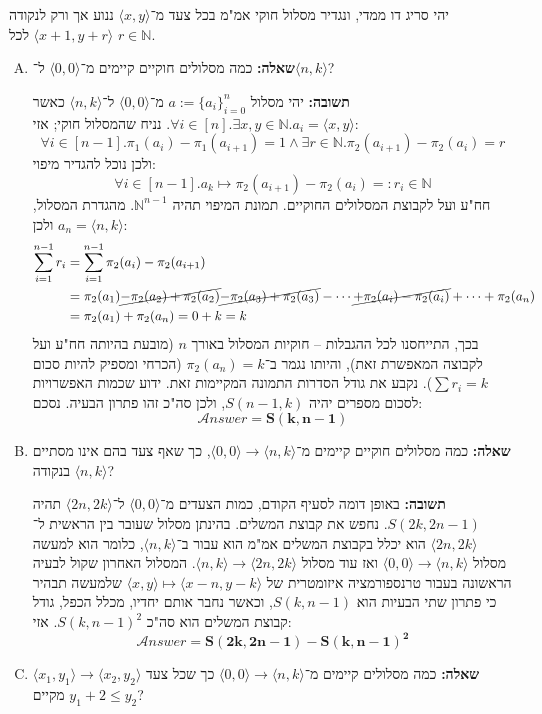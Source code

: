\documentclass[]{article}
\newcommand\N     {\mathbb{N}}
\newcommand\ans   {\mathscr{A}\!\mathit{nswer}}
\newcommand\ra    {\rangle}
\newcommand\la    {\langle}
\begin{document}
	\section{}
	יהי סריג דו ממדי, ונגדיר מסלול חוקי אמ"מ בכל צעד מ־$\la x, y \ra$ ננוע אך ורק לנקודה $\la x + 1, y + r \ra$ לכל $r \in \N$. 
	\begin{enumerate}[(A)]
		\item \textbf{שאלה: }כמה מסלולים חוקיים קיימים מ־$\la 0, 0 \ra$ ל־$\la n, k\ra$? 
		
		\textbf{תשובה: }יהי מסלול $a := \{a_i\}_{i = 0}^n$ מ־$\la 0, 0 \ra$ ל־$\la n, k \ra$ כאשר $\forall i \in [n]. \exists x, y \in \N. a_i = \la x, y \ra$. נניח שהמסלול חוקי; אזי: 
		\[\forall i \in [n - 1]. \pi_1(a_i) - \pi_1(a_{i + 1}) = 1 \land \exists r \in \N. \pi_2(a_{i + 1}) - \pi_2(a_{i}) = r\]
		ולכן נוכל להגדיר מיפוי: 
		\[ \forall i \in [n - 1]. a_k \mapsto \pi_2(a_{i + 1}) - \pi_2(a_{i}) =: r_i \in \N \]
		חח"ע ועל לקבוצת המסלולים החוקיים. תמונת המיפוי תהיה $\N^{n - 1}$. מהגדרת המסלול, $a_n = \la n, k \ra$ ולכן: 
		\begin{align*}
			\sum_{i = 1}^{n - 1}r_i &= \sum_{i = 1}^{n - 1}\pi_2(a_i) - \pi_2(a_{i + 1}) \\ 
			&= \pi_2(a_1) \cancel{- \pi_2(a_2) + \pi_2(a_2)} \cancel{- \pi_2(a_3) + \pi_2(a_3)} - \cdots \cancel{+ \pi_2(a_i) - \pi_2(a_i)} + \dots + \pi_2(a_n) \\
			&= \pi_2(a_1) + \pi_2(a_n) = 0 + k = k
		\end{align*}
		בכך, התייחסנו לכל ההגבלות – חוקיות המסלול באורך $n$ (מובעת בהיותה חח"ע ועל לקבוצה המאפשרת זאת), והיותו נגמר ב־$\pi_2(a_n) = k$ (הכרחי ומספיק להיות סכום $\sum r_i = k$). נקבע את גודל הסדרות התמונה המקיימות זאת. ידוע שכמות האפשרויות לסכום מספרים יהיה $S(n - 1, k)$, ולכן סה"כ זהו פתרון הבעיה. נסכם: 
		\[ \ans = \bm{S(k, n - 1)} \]
		\item \textbf{שאלה: }כמה מסלולים חוקיים קיימים מ־$\la 0, 0 \ra \to \la n, k \ra$, כך שאף צעד בהם אינו מסתיים בנקודה $\la n, k \ra$?
		
		\textbf{תשובה: }באופן דומה לסעיף הקודם, כמות הצעדים מ־$\la 0, 0 \ra$ ל־$\la 2n, 2k\ra$ תהיה $S(2k, 2n - 1)$. נחפש את קבוצת המשלים. בהינתן מסלול שעובר בין הראשית ל־$\la 2n, 2k\ra$ הוא יכלל בקבוצת המשלים אמ"מ הוא עבור ב־$\la n, k \ra$, כלומר הוא למעשה מסלול $\la 0, 0 \ra \to \la n, k\ra$ ואז עוד מסלול $\la n, k\ra \to \la 2n, 2k \ra$. המסלול האחרון שקול לבעיה הראשונה בעבור טרנספורמציה איזומטרית של $\la x, y \ra \mapsto \la x - n, y - k\ra$ שלמעשה תבהיר כי פתרון שתי הבעיות הוא $S(k, n - 1)$, וכאשר נחבר אותם יחדיו, מכלל הכפל, גודל קבוצת המשלים הוא סה"כ $S(k, n - 1)^2$. אזי: 
		\[ \ans = \bm{S(2k, 2n - 1) - S(k, n - 1)^2} \]
		\item \textbf{שאלה: }כמה מסלולים קיימים מ־$\la 0, 0 \ra \to \la n, k \ra$ כך שכל צעד $\la x_1, y_1 \ra \to \la x_2, y_2 \ra$ מקיים $y_1 + 2 \le y_2$?
		

\end{enumerate}
\end{document}

